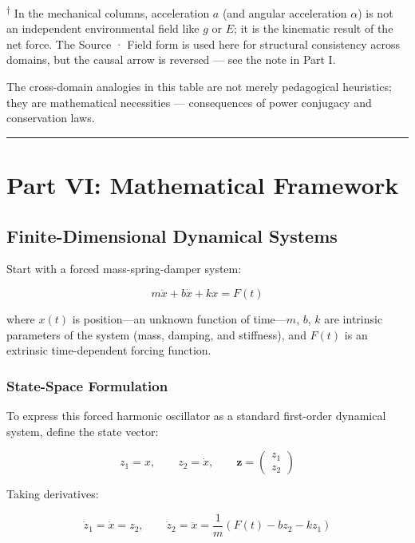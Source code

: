 \documentclass[
  letterpaper,
  DIV=11,
  numbers=noendperiod]{scrartcl}
\begin{document}
\textsuperscript{†} In the mechanical columns, acceleration \(a\) (and
angular acceleration \(\alpha\)) is not an independent environmental
field like \(g\) or \(E\); it is the kinematic result of the net force.
The Source · Field form is used here for structural consistency across
domains, but the causal arrow is reversed --- see the note in Part I.

The cross-domain analogies in this table are not merely pedagogical
heuristics; they are mathematical necessities --- consequences of power
conjugacy and conservation laws.

\begin{center}\rule{0.5\linewidth}{0.5pt}\end{center}

\section{Part VI: Mathematical
Framework}\label{part-vi-mathematical-framework}

\subsection{Finite-Dimensional Dynamical
Systems}\label{finite-dimensional-dynamical-systems}

Start with a forced mass-spring-damper system:

\[m\ddot{x} + b\dot{x} + kx = F(t)\]

where \(x(t)\) is position---an unknown function of time---\(m\), \(b\),
\(k\) are intrinsic parameters of the system (mass, damping, and
stiffness), and \(F(t)\) is an extrinsic time-dependent forcing
function.

\subsubsection{State-Space Formulation}\label{state-space-formulation}

To express this forced harmonic oscillator as a standard first-order
dynamical system, define the state vector:

\[z_1 = x, \qquad z_2 = \dot{x}, \qquad \mathbf{z} = \begin{pmatrix} z_1 \\ z_2 \end{pmatrix}\]

Taking derivatives:

\[\dot{z}_1 = \dot{x} = z_2, \qquad \dot{z}_2 = \ddot{x} = \frac{1}{m}\left(F(t) - bz_2 - kz_1\right)\]
\end{document}

